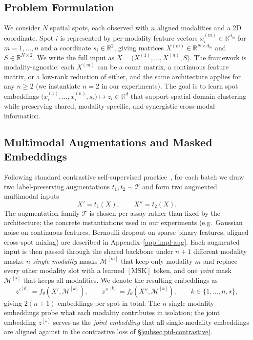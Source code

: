 \documentclass{article}
\theoremstyle{plain}
\theoremstyle{definition}
\begin{document}
\subsection{Problem Formulation}
We consider $N$ spatial spots, each observed with $n$ aligned modalities and a 2D coordinate. Spot $i$ is represented by per-modality feature vectors $x_i^{(m)} \in \mathbb{R}^{d_m}$ for $m = 1, \ldots, n$ and a coordinate $s_i \in \mathbb{R}^2$, giving matrices $X^{(m)} \in \mathbb{R}^{N \times d_m}$ and $S \in \mathbb{R}^{N \times 2}$. We write the full input as $X = \bigl(X^{(1)}, \ldots, X^{(n)}, S\bigr)$. The framework is modality-agnostic: each $X^{(m)}$ can be a count matrix, a continuous feature matrix, or a low-rank reduction of either, and the same architecture applies for any $n \geq 2$ (we instantiate $n=2$ in our experiments). The goal is to learn spot embeddings $\bigl(x_i^{(1)}, \ldots, x_i^{(n)}, s_i\bigr) \mapsto z_i \in \mathbb{R}^d$ that support spatial domain clustering while preserving shared, modality-specific, and synergistic cross-modal information.

\subsection{Multimodal Augmentations and Masked Embeddings}
\label{subsec:augmentations}
Following standard contrastive self-supervised practice~\cite{chen2020simple,tian2020contrastive}, for each batch we draw two label-preserving augmentations $t_1, t_2 \sim \mathcal{T}$ and form two augmented multimodal inputs
\begin{equation}
X' = t_1(X), \qquad X'' = t_2(X).
\end{equation}
The augmentation family $\mathcal{T}$ is chosen per assay rather than fixed by the architecture; the concrete instantiations used in our experiments (e.g.\ Gaussian noise on continuous features, Bernoulli dropout on sparse binary features, aligned cross-spot mixing) are described in Appendix~\ref{app:impl-aug}. Each augmented input is then passed through the shared backbone under $n + 1$ different modality masks: $n$ \emph{single-modality} masks $\mathcal{M}^{[m]}$ that keep only modality $m$ and replace every other modality slot with a learned $[\mathrm{MSK}]$ token, and one \emph{joint} mask $\mathcal{M}^{[\star]}$ that keeps all modalities. We denote the resulting embeddings as
\begin{equation}
z'^{[k]} = f_\theta(X', \mathcal{M}^{[k]}), \qquad z''^{[k]} = f_\theta(X'', \mathcal{M}^{[k]}), \qquad k \in \{1, \ldots, n, \star\},
\end{equation}
giving $2(n+1)$ embeddings per spot in total. The $n$ single-modality embeddings probe what each modality contributes in isolation; the joint embedding $z^{[\star]}$ serves as the \emph{joint embedding} that all single-modality embeddings are aligned against in the contrastive loss of \S\ref{subsec:pid-contrastive}.
\end{document}

